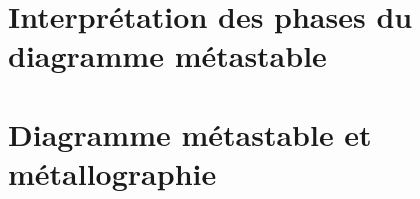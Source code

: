 \documentclass[a4paper,14pt]{article}
\begin{document}
%

\section{Interprétation des phases du diagramme métastable }



\section{Diagramme métastable  et métallographie}

\end{document}
